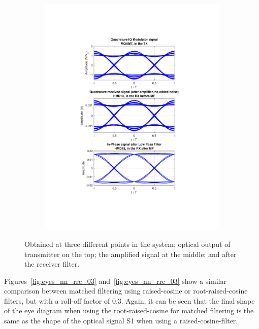 \begin{refsection}
\begin{figure}[H]
\begin{minipage}{\linewidth}
\begin{subfigure}{.45\textwidth}
		\includegraphics[clip, trim=4cm 4cm 4cm 4cm,
			width=\textwidth]{./sdf/m_qam_system/figures/eyes/simulRrc09Sp60Np00_q.pdf}
	\end{subfigure}
	\caption{
		Obtained at
		three different points in the system: optical output of transmitter on the top;
		the amplified signal at the middle; and
		after the receiver filter.
		\label{fig:eyes_nn_rrc_09}}
	\end{minipage}
	
\end{figure}

Figures~\ref{fig:eyes_nn_rrc_03} and~\ref{fig:eyes_nn_rrc_03} show a similar
comparison between matched filtering using raised-cosine or root-raised-cosine
filters, but with a roll-off factor of 0.3. Again, it can be seen that the
final shape of the eye diagram when using the root-raised-cosine for matched
filtering is the same as the shape of the optical signal S1 when using a
raised-cosine-filter.
\begin{table}[H]
	\centering
	

\end{table}
\end{refsection}
